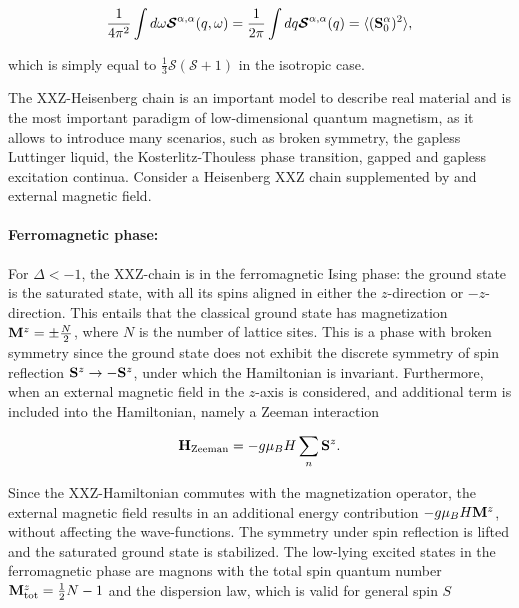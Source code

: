 \documentclass{homework}
\begin{document}
\begin{equation}
    \frac{1}{4\pi^2} \int d\omega \bm{\mathcal S}^{\alpha, \alpha}(q, \omega) = \frac{1}{2 \pi} \int dq \bm{\mathcal S}^{\alpha, \alpha}(q) = \langle ({\bf S}_0^\alpha)^2 \rangle,
\end{equation}

which is simply equal to $\frac{1}{3} \bm{\mathcal S}( \bm{\mathcal S}+ 1)$ in the isotropic case. \\

\begin{tcolorbox}[colback = my-blue, title = Physical Context]

The XXZ-Heisenberg chain is an important model to describe real material and is the most important paradigm of low-dimensional quantum magnetism, as it allows to introduce many scenarios, such as broken symmetry, the gapless Luttinger liquid, the Kosterlitz-Thouless phase transition, gapped and gapless excitation continua. Consider a Heisenberg XXZ chain supplemented by and external magnetic field. \\

\end{tcolorbox}

\paragraph{\textbf{Ferromagnetic phase: }}

For $\Delta < -1$, the XXZ-chain is in the ferromagnetic Ising phase: the ground state is the saturated state, with all its spins aligned in either the $z$-direction or $-z$-direction. This entails that the classical ground state has magnetization ${\bf M}^z = \pm \frac{N}{2}$, where $N$ is the number of lattice sites. This is a phase with broken symmetry since the ground state does not exhibit the discrete symmetry of spin reflection ${\bf S}^z \rightarrow -{\bf S}^z$, under which the Hamiltonian is invariant. Furthermore, when an external magnetic field in the $z$-axis is considered, and additional term is included into the Hamiltonian, namely a Zeeman interaction 

$$
    {\bf H}_{\textnormal{Zeeman}} = - g \mu_B H \sum_{n} {\bf S}^z.
$$

Since the XXZ-Hamiltonian commutes with the magnetization operator, the external magnetic field results in an additional energy contribution $-g \mu_B H {\bf M}^z$, without affecting the wave-functions. The symmetry under spin reflection is lifted and the saturated ground state is stabilized. The low-lying excited states in the ferromagnetic phase are magnons with the total spin quantum number ${\bf M}^z_{\textnormal{tot}} = \frac{1}{2} N - 1$ and the dispersion law, which is valid for general spin $S$
\end{document}
